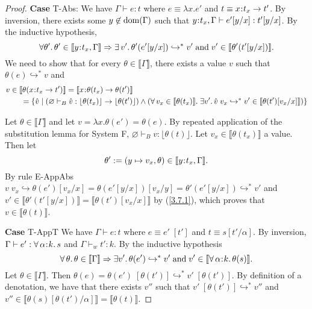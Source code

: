 \documentclass[11pt]{article}
\newcommand{\al}{\alpha}
\newcommand{\bind}{\hspace{0.05em}{:}\hspace{0.05em}} %
\newcommand{\lb}{\llbracket}         %
\newcommand{\rb}{\rrbracket}         %
\newcommand{\step}{\hookrightarrow}
\newcommand{\many}{\hookrightarrow^*}
\newcommand{\polytype}[3]{\forall\, #1\bind #2.\, #3}
\newcommand{\functype}[3]{#1\bind #2 \rightarrow #3}
\newcommand{\dom}[1]{{\rm dom}(#1)}
\begin{document}
\begin{proof}
{\bf Case} {\sc T-Abs}: We have $\Gamma \vdash e : t$ where $e \equiv \lambda x.e'$ and $t \equiv \functype{x}{t_x}{t'}$. By inversion, there exists some $y\not\in\dom{\Gamma}$ such that $y\bind t_x, \Gamma \vdash e'[y/x] : t'[y/x]$. By the inductive hypothesis,
\begin{equation}\label{3.7.1}
\forall\theta'.\, \theta' \in \lb y\bind t_x,\Gamma\rb \Rightarrow \exists\, v'.\, \theta'(e'[y/x]) \many v' \;{\rm and}\; v' \in \lb\theta'(t'[y/x])\rb.\end{equation}
We need to show that for every $\theta \in \lb\Gamma\rb$, there exists a value $v$ such that $\theta(e) \many v$ and 
\begin{align*}
v \in \lb \theta(&\functype{x}{t_x}{t'}) \rb = \lb \functype{x}{\theta(t_x)}{\theta(t')}\rb\\
=&\; \{ \hat{v} \;|\; (\varnothing \vdash_B {\hat v} : \lfloor \theta(t_x) \rfloor \rightarrow \lfloor \theta(t') \rfloor) \wedge ( \forall\, v_x \in \lb \theta(t_x) \rb.\; \exists v'.\,\hat v \; v_x \many v' \in \lb\theta(t')[v_x/x] \rb) \}
\end{align*}

Let $\theta \in \lb\Gamma\rb$ and let $v = \lambda x.\theta(e') = \theta(e)$. By repeated application of the substitution lemma for System F, $\varnothing \vdash_B v : \lfloor \theta(t) \rfloor$.
Let $v_x \in \lb \theta(t_x)\rb$ a value.  Then let
\[\theta' := (y\mapsto v_x, \theta) \in \lb y\bind t_x,\Gamma\rb.\] 
By rule {\sc E-AppAbs} $v\; v_x \step \theta(e')[v_x/x] = \theta(e'[y/x])[v_x/y] = \theta'(e'[y/x]) \many v'$ and $v' \in \lb\theta'(t'[y/x])\rb = \lb \theta(t')[v_x/x]\rb$ by (\ref{3.7.1}), which proves that $v \in \lb\theta(t)\rb$.

{\bf Case} {\sc T-AppT} We have $\Gamma \vdash e : t$ where $e \equiv e'\; [t']$ and $t \equiv s[t'/\al]$. By inversion, $\Gamma \vdash e' : \polytype{\al}{k}{s}$ and $\Gamma \vdash_w t': k$. By the inductive hypothesis
\begin{equation}\label{3.16}
\forall\, \theta.\, \theta \in \lb\Gamma\rb \Rightarrow \exists v'.\, \theta(e') \many v' \;{\rm and}\; v' \in \lb\polytype{\al}{k}{\theta(s)}\rb.
\end{equation}
Let $\theta \in \lb\Gamma\rb$. Then $\theta(e) = \theta(e')\; [\theta(t')] \many v'\; [\theta(t')]$. By definition of a denotation, we have that there exists $v''$ such that $v'\; [\theta(t')] \many v''$ and $v'' \in \lb \theta(s)[\theta(t')/\al]\rb = \lb\theta(t)\rb$.


\end{proof}
\end{document}
